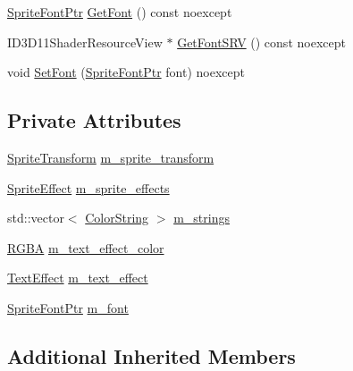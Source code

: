 \begin{DoxyCompactItemize}
\item 
\hyperlink{namespacemage_1_1rendering_ab2f34196c20422ca3692ad3f3bff3a5d}{Sprite\+Font\+Ptr} \hyperlink{classmage_1_1rendering_1_1_sprite_text_a4ec33c106762e7f8d4d04cde0bf03669}{Get\+Font} () const noexcept
\item 
I\+D3\+D11\+Shader\+Resource\+View $\ast$ \hyperlink{classmage_1_1rendering_1_1_sprite_text_af9e6eb6e62d9c638dc86a7a978524aa9}{Get\+Font\+S\+RV} () const noexcept
\item 
void \hyperlink{classmage_1_1rendering_1_1_sprite_text_acad93e0803d47502db5ef16998d2f38a}{Set\+Font} (\hyperlink{namespacemage_1_1rendering_ab2f34196c20422ca3692ad3f3bff3a5d}{Sprite\+Font\+Ptr} font) noexcept
\end{DoxyCompactItemize}
\subsection*{Private Attributes}
\begin{DoxyCompactItemize}
\item 
\hyperlink{classmage_1_1_sprite_transform}{Sprite\+Transform} \hyperlink{classmage_1_1rendering_1_1_sprite_text_af702fbdab6468fbd5856434192a32787}{m\+\_\+sprite\+\_\+transform}
\item 
\hyperlink{namespacemage_1_1rendering_a4dbc3536c87b906f1d41d863ec458e78}{Sprite\+Effect} \hyperlink{classmage_1_1rendering_1_1_sprite_text_a49995d4b435446b48d2d112113834f23}{m\+\_\+sprite\+\_\+effects}
\item 
std\+::vector$<$ \hyperlink{classmage_1_1rendering_1_1_color_string}{Color\+String} $>$ \hyperlink{classmage_1_1rendering_1_1_sprite_text_a2f9d4a00ad08710fe36eebd825b2f142}{m\+\_\+strings}
\item 
\hyperlink{structmage_1_1_r_g_b_a}{R\+G\+BA} \hyperlink{classmage_1_1rendering_1_1_sprite_text_a2fffa5ce343b92f32cbfe5234b182247}{m\+\_\+text\+\_\+effect\+\_\+color}
\item 
\hyperlink{classmage_1_1rendering_1_1_sprite_text_af07ecf28d2ab8997c011cab74e799ef7}{Text\+Effect} \hyperlink{classmage_1_1rendering_1_1_sprite_text_a795a35dc3671097dd29afaa4b2c5ac3a}{m\+\_\+text\+\_\+effect}
\item 
\hyperlink{namespacemage_1_1rendering_ab2f34196c20422ca3692ad3f3bff3a5d}{Sprite\+Font\+Ptr} \hyperlink{classmage_1_1rendering_1_1_sprite_text_ad682901cbe866d2dc316bf3238812d25}{m\+\_\+font}
\end{DoxyCompactItemize}
\subsection*{Additional Inherited Members}


